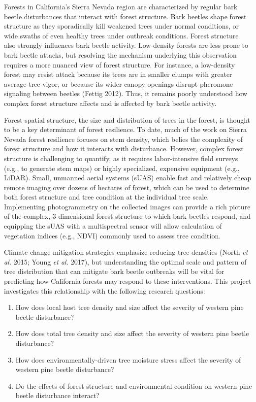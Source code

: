\documentclass[]{article}
\begin{document}
Forests in California's Sierra Nevada region are characterized by
regular bark beetle disturbances that interact with forest structure.
Bark beetles shape forest structure as they sporadically kill weakened
trees under normal conditions, or wide swaths of even healthy trees
under outbreak conditions. Forest structure also strongly influences
bark beetle activity. Low-density forests are less prone to bark beetle
attacks, but resolving the mechanism underlying this observation
requires a more nuanced view of forest structure. For instance, a
low-density forest may resist attack because its trees are in smaller
clumps with greater average tree vigor, or because its wider canopy
openings disrupt pheromone signaling between beetles (Fettig 2012).
Thus, it remains poorly understood how complex forest structure affects
and is affected by bark beetle activity.

Forest spatial structure, the size and distribution of trees in the
forest, is thought to be a key determinant of forest resilience. To
date, much of the work on Sierra Nevada forest resilience focuses on
stem density, which belies the complexity of forest structure and how it
interacts with disturbance. However, complex forest structure is
challenging to quantify, as it requires labor-intensive field surveys
(e.g., to generate stem maps) or highly specialized, expensive equipment
(e.g., LiDAR). Small, unmanned aerial systems (sUAS) enable fast and
relatively cheap remote imaging over dozens of hectares of forest, which
can be used to determine both forest structure and tree condition at the
individual tree scale. Implementing photogrammetry on the collected
images can provide a rich picture of the complex, 3-dimensional forest
structure to which bark beetles respond, and equipping the sUAS with a
multispectral sensor will allow calculation of vegetation indices (e.g.,
NDVI) commonly used to assess tree condition.

Climate change mitigation strategies emphasize reducing tree densities
(North \emph{et al.} 2015; Young \emph{et al.} 2017), but understanding
the optimal scale and pattern of tree distribution that can mitigate
bark beetle outbreaks will be vital for predicting how California
forests may respond to these interventions. This project investigates
this relationship with the following research questions:

\begin{enumerate}
\def\labelenumi{\arabic{enumi}.}
\item
  How does local host tree density and size affect the severity of
  western pine beetle disturbance?
\item
  How does total tree density and size affect the severity of western
  pine beetle disturbance?
\item
  How does environmentally-driven tree moisture stress affect the
  severity of western pine beetle disturbance?
\item
  Do the effects of forest structure and environmental condition on
  western pine beetle disturbance interact?
\end{enumerate}
\end{document}
